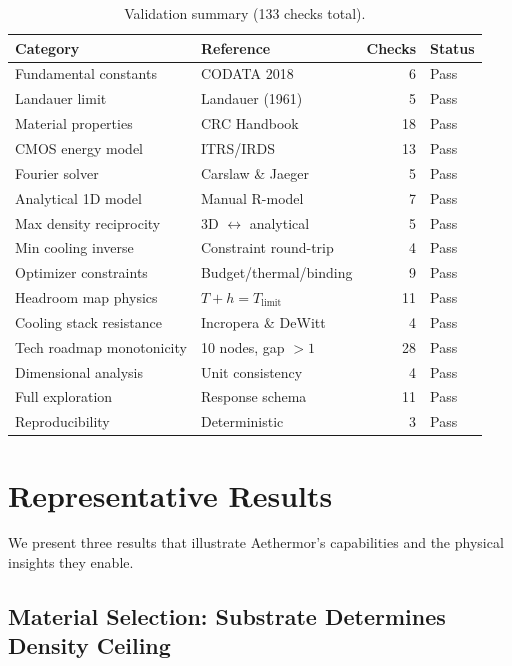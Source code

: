 \documentclass[11pt,twocolumn]{article}
\begin{document}
\begin{table}[t]
\centering
\caption{Validation summary (133 checks total).}
\label{tab:validation}
\small
\begin{tabular}{@{}llrl@{}}
\toprule
Category & Reference & Checks & Status \\
\midrule
Fundamental constants     & CODATA 2018         & 6  & Pass \\
Landauer limit            & Landauer (1961)     & 5  & Pass \\
Material properties       & CRC Handbook        & 18 & Pass \\
CMOS energy model         & ITRS/IRDS           & 13 & Pass \\
Fourier solver            & Carslaw \& Jaeger   & 5  & Pass \\
Analytical 1D model       & Manual R-model      & 7  & Pass \\
Max density reciprocity   & 3D $\leftrightarrow$ analytical & 5 & Pass \\
Min cooling inverse       & Constraint round-trip & 4 & Pass \\
Optimizer constraints     & Budget/thermal/binding & 9 & Pass \\
Headroom map physics      & $T + h = T_{\mathrm{limit}}$ & 11 & Pass \\
Cooling stack resistance  & Incropera \& DeWitt & 4  & Pass \\
Tech roadmap monotonicity & 10 nodes, gap $> 1$ & 28 & Pass \\
Dimensional analysis      & Unit consistency    & 4  & Pass \\
Full exploration          & Response schema     & 11 & Pass \\
Reproducibility           & Deterministic       & 3  & Pass \\
\bottomrule
\end{tabular}
\end{table}


\section{Representative Results}
\label{sec:results}

We present three results that illustrate Aethermor's capabilities and
the physical insights they enable.

\subsection{Material Selection: Substrate Determines Density Ceiling}
\end{document}
